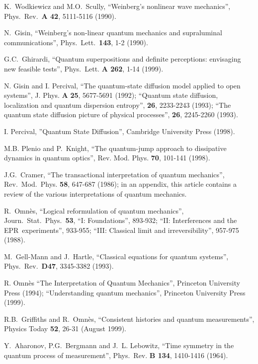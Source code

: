 \documentclass[12pt,onecolumn]{article}%
\begin{document}
\begin{thebibliography}{999}
K.\ Wodkiewicz and M.O.\ Scully, ``Weinberg's nonlinear wave
mechanics'', Phys.\ Rev.\ \textbf{A 42}, 5111-5116 (1990).

N.\ Gisin, ``Weinberg's non-linear quantum mechanics
and supraluminal communications'', Phys.\ Lett.\ \textbf{143}, 1-2 (1990).

G.C.\ Ghirardi, ``Quantum superpositions and definite
perceptions: envisaging new feasible tests'', Phys.\ Lett. \textbf{A 262},
1-14 (1999).

N. Gisin and I. Percival, ``The quantum-state diffusion model
applied to open systems'', J. Phys. \textbf{A} \textbf{25}, 5677-5691 (1992);
``Quantum state diffusion, localization and quantum dispersion entropy'',
\textbf{26}, 2233-2243 (1993); ``The quantum state diffusion picture of
physical processes'', \textbf{26}, 2245-2260 (1993).

I. Percival, ''Quantum State Diffusion'', Cambridge
University Press (1998).

M.B. Plenio and P.\ Knight, ``The quantum-jump approach to
dissipative dynamics in quantum optics'', Rev. Mod. Phys. \textbf{70}, 101-141 (1998).

J.G.\ Cramer, ``The transactional interpretation of
quantum mechanics'', Rev.\ Mod.\ Phys. \textbf{58}, 647-687 (1986); in an
appendix, this article contains a review of the various interpretations of
quantum mechanics.

R.\ Omn\`{e}s, ``Logical reformulation of quantum
mechanics'', Journ.\ Stat.\ Phys.\ \textbf{53}, ``I: Foundations'', 893-932;
``II: Interferences and the EPR\ experiments'', 933-955; ``III: Classical
limit and irreversibility'', 957-975 (1988).

M.\ Gell-Mann and J.\ Hartle, ``Classical equations for
quantum systems'', Phys.\ Rev.\ \textbf{D47}, 3345-3382 (1993).

R. Omn\`{e}s ``The Interpretation of Quantum Mechanics'',
Princeton University Press (1994); ``Understanding quantum mechanics'',
Princeton University Press (1999).

R.B.\ Griffiths and R.\ Omn\`{e}s, ``Consistent histories and
quantum measurements'', Physics Today \textbf{52}, 26-31 (August 1999).

Y.\ Aharonov, P.G.\ Bergmann and J.\ L. Lebowitz, ``Time
symmetry in the quantum process of measurement'', Phys.\ Rev. \textbf{B 134},
1410-1416 (1964).


\end{thebibliography}
\end{document}
